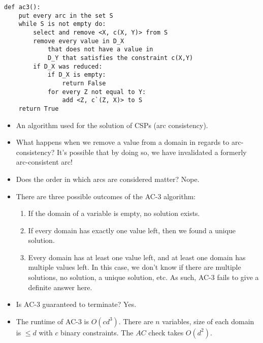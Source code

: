 \documentclass{article}
\begin{document}
\begin{itemize}
\begin{lstlisting}
def ac3():
    put every arc in the set S
    while S is not empty do:
        select and remove <X, c(X, Y)> from S
        remove every value in D_X 
            that does not have a value in
            D_Y that satisfies the constraint c(X,Y)
        if D_X was reduced:
            if D_X is empty:
                return False
            for every Z not equal to Y:
                add <Z, c`(Z, X)> to S
    return True
\end{lstlisting}
        \begin{itemize}
            \item An algorithm used for the solution of CSPs (arc consistency).
            \item What happens when we remove a value from a domain in regards to arc-consistency?  It's possible that by doing so, we have invalidated a formerly arc-consistent arc!
            \item Does the order in which arcs are considered matter?  Nope.
            \item There are three possible outcomes of the AC-3 algorithm:
                \begin{enumerate}
                    \item If the domain of a variable is empty, no solution exists.
                    \item If every domain has exactly one value left, then we found a unique solution.
                    \item Every domain has at least one value left, and at least one domain has multiple values left.  In this case, we don't know if there are multiple solutions, no solution, a unique solution, etc.  As such, AC-3 fails to give a definite answer here.
                \end{enumerate}
            \item Is AC-3 guaranteed to terminate?  Yes.
            \item The runtime of AC-3 is $O(cd^3)$.  There are $n$ variables, size of each domain is $\leq d$ with $c$ binary constraints.  The $AC$ check takes $O(d^2)$.
        \end{itemize}
\end{itemize}
\end{document}
